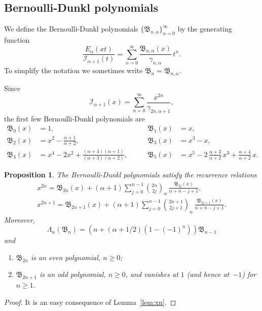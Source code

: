 \documentclass[10pt,a4paper]{article}
\theoremstyle{plain}
\newtheorem{proposition}[theorem]{Proposition}
\theoremstyle{definition}
\numberwithin{equation}{section} %
\newcommand{\Ea}{E_{\alpha}}
\newcommand{\La}{\Lambda_{\alpha}}
\newcommand{\I}{\mathcal{I}}
\newcommand{\B}{\mathfrak{B}}
\newcommand{\cc}{\gamma}
\begin{document}
\subsection{Bernoulli-Dunkl polynomials}

We define the Bernoulli-Dunkl polynomials $\{\B_{n,\alpha}\}_{n=0}^{\infty}$ by the generating function
\begin{equation}
\label{eq:defbd}
  \frac{\Ea(xt)}{\I_{\alpha+1}(t)}
  = \sum_{n=0}^\infty \frac{\B_{n,\alpha}(x)}{\cc_{n,\alpha}}\,t^n.
\end{equation}
To simplify the notation we sometimes write $\B_n=\B_{n,\alpha}$.

Since
\[
  \I_{\alpha+1}(x) = \sum_{n=0}^\infty \frac{x^{2n}}{\cc_{2n,\alpha+1}},
\]
the first few Bernoulli-Dunkl polynomials are
\begin{align*}
  \B_0(x) &= 1, \qquad & \B_1(x) &= x, \\
  \B_2(x) &= x^2 - \frac{\alpha+1}{\alpha+2},\qquad &
  \B_3(x) &= x^3 - x,\\
  \B_4(x) &= x^4 - 2x^2 + \frac{(\alpha+4)(\alpha+1)}{(\alpha+3)(\alpha+2)},\qquad &
  \B_5(x) &= x^5 - 2\,\frac{\alpha+3}{\alpha+2}\,x^3 + \frac{\alpha+4}{\alpha+2}\,x.
\end{align*}

\begin{proposition}
The Bernoulli-Dunkl polynomials satisfy the recurrence relations
\begin{align}
\label{eq:x2nbd}
  x^{2n} = \B_{2n}(x)+(\alpha+1) \sum_{j=0}^{n-1} \binom{2n}{2j}_{\!\alpha}
  \, \frac{\B_{2j}(x)}{\alpha+n-j+1},\\
\nonumber
  x^{2n+1} = \B_{2n+1}(x) + (\alpha+1) \sum_{j=0}^{n-1} \binom{2n+1}{2j+1}_{\!\alpha}
  \, \frac{\B_{2j+1}(x)}{\alpha+n-j+1}.
\end{align}
Moreover,
\begin{equation}
\label{eq:LaBn}
  \La(\B_n) = (n+(\alpha+1/2)(1-(-1)^n)) \B_{n-1}
\end{equation}
and
\begin{enumerate}
\item $\B_{2n}$ is an even polynomial, $n\ge 0$;
\item $\B_{2n+1}$ is an odd polynomial, $n\ge 0$, and vanishes at $1$ (and hence at~$-1$) for $n\ge 1$.
\end{enumerate}
\end{proposition}

\begin{proof}
It is an easy consequence of Lemma~\ref{lem:xn}.
\end{proof}
\end{document}
